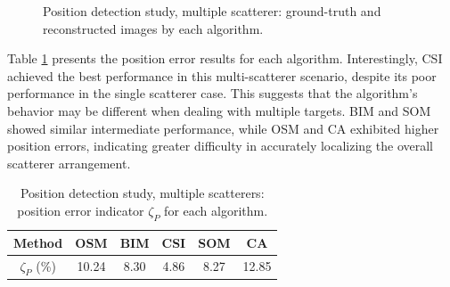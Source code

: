 \documentclass{IEEEtran}
\begin{document}
\begin{figure}[!htb]
                    \caption{Position detection study, multiple scatterer: ground-truth and reconstructed images by each algorithm.}
                    \label{fig:position:multiple:recons}
                \end{figure}

                Table \ref{tab:position:multiple:zeta_p} presents the position error results for each algorithm. Interestingly, CSI achieved the best performance in this multi-scatterer scenario, despite its poor performance in the single scatterer case. This suggests that the algorithm's behavior may be different when dealing with multiple targets. BIM and SOM showed similar intermediate performance, while OSM and CA exhibited higher position errors, indicating greater difficulty in accurately localizing the overall scatterer arrangement.

                \begin{table}[!htb]
                    \centering
                    \renewcommand{\arraystretch}{1.5}
                    \caption{Position detection study, multiple scatterers: position error indicator $\zeta_P$ for each algorithm.}
                    \label{tab:position:multiple:zeta_p}
                    \begin{tabular}{cccccc}
                        Method & OSM & BIM & CSI & SOM & CA \\\hline
                        $\zeta_P$ (\%) & 10.24 & 8.30 & 4.86 & 8.27 & 12.85 \\
                    \end{tabular}   
                \end{table}
                
\end{document}
